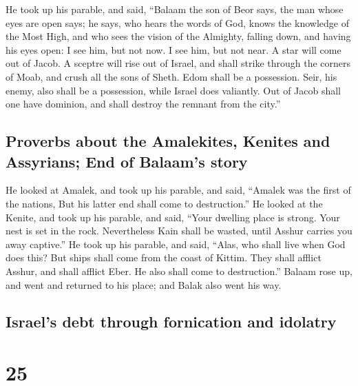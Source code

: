  He took up his parable, and said, ``Balaam the son of
Beor says, the man whose eyes are open says;  he says,
who hears the words of God, knows the knowledge of the Most High, and
who sees the vision of the Almighty, falling down, and having his eyes
open:  I see him, but not now. I see him, but not near. A
star will come out of Jacob. A sceptre will rise out of Israel, and
shall strike through the corners of Moab, and crush all the sons of
Sheth.  Edom shall be a possession. Seir, his enemy, also
shall be a possession, while Israel does valiantly.  Out
of Jacob shall one have dominion, and shall destroy the remnant from the
city.''

\hypertarget{proverbs-about-the-amalekites-kenites-and-assyrians-end-of-balaams-story}{%
\subsection{Proverbs about the Amalekites, Kenites and Assyrians; End of
Balaam's
story}\label{proverbs-about-the-amalekites-kenites-and-assyrians-end-of-balaams-story}}

 He looked at Amalek, and took up his parable, and said,
``Amalek was the first of the nations, But his latter end shall come to
destruction.''  He looked at the Kenite, and took up his
parable, and said, ``Your dwelling place is strong. Your nest is set in
the rock.  Nevertheless Kain shall be wasted, until
Asshur carries you away captive.''  He took up his
parable, and said, ``Alas, who shall live when God does this?
 But ships shall come from the coast of Kittim. They
shall afflict Asshur, and shall afflict Eber. He also shall come to
destruction.''  Balaam rose up, and went and returned to
his place; and Balak also went his way.

\hypertarget{israels-debt-through-fornication-and-idolatry}{%
\subsection{Israel's debt through fornication and
idolatry}\label{israels-debt-through-fornication-and-idolatry}}

\hypertarget{section-24}{%
\section{25}\label{section-24}}

